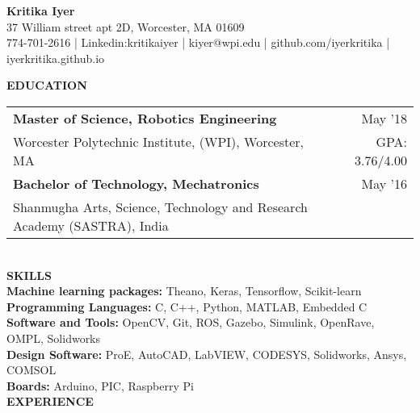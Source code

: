 \documentclass[10pt,a4paper]{article}
\begin{document}
\begin{center}

\textbf{\Large{Kritika Iyer}}\\
37 William street apt 2D, Worcester, MA 01609\\
774-701-2616 | Linkedin:kritikaiyer | kiyer@wpi.edu | github.com/iyerkritika | iyerkritika.github.io\\
\end{center}
\textbf{EDUCATION}\\
\begin{tabular}{p{} r}
\textbf{Master of Science, Robotics Engineering} & May '18 \\
Worcester Polytechnic Institute, (WPI), Worcester, MA & GPA: 3.76/4.00 \\[1ex]
\textbf{Bachelor of Technology, Mechatronics} & May '16 \\
Shanmugha Arts, Science, Technology  and Research Academy (SASTRA), India
\end{tabular}
\\[1\baselineskip]
\textbf{SKILLS}\\
\textbf{Machine learning packages:} Theano, Keras, Tensorflow, Scikit-learn\\
\textbf{Programming Languages:} C, C++, Python, MATLAB, Embedded C\\
\textbf{Software and Tools:} OpenCV, Git, ROS, Gazebo, Simulink, OpenRave, OMPL, Solidworks \\
\textbf{Design Software:} ProE, AutoCAD, LabVIEW, CODESYS, Solidworks, Ansys, COMSOL\\
\textbf{Boards:} Arduino, PIC, Raspberry Pi\\[1\baselineskip]
\textbf{EXPERIENCE}\\
\end{document}
